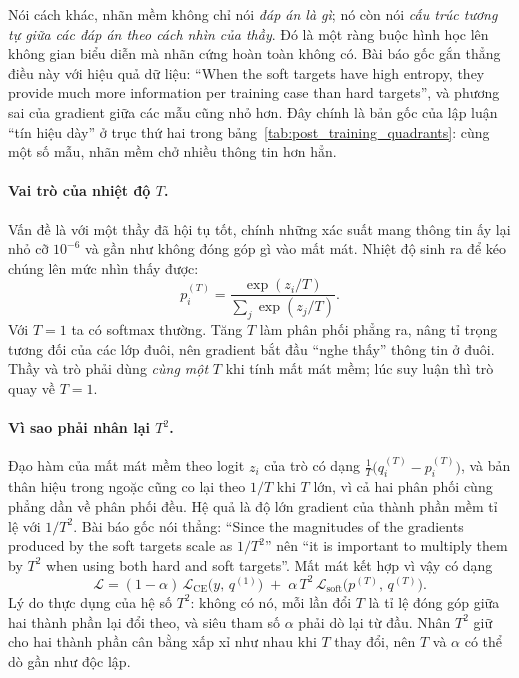 Nói cách khác, nhãn mềm không chỉ nói \emph{đáp án là gì}; nó còn nói \emph{cấu trúc tương tự giữa các đáp án theo cách nhìn của thầy}. Đó là một ràng buộc hình học lên không gian biểu diễn mà nhãn cứng hoàn toàn không có. Bài báo gốc gắn thẳng điều này với hiệu quả dữ liệu: ``When the soft targets have high entropy, they provide much more information per training case than hard targets'', và phương sai của gradient giữa các mẫu cũng nhỏ hơn. Đây chính là bản gốc của lập luận ``tín hiệu dày'' ở trục thứ hai trong bảng~\ref{tab:post_training_quadrants}: cùng một số mẫu, nhãn mềm chở nhiều thông tin hơn hẳn.

\paragraph{Vai trò của nhiệt độ $T$.} Vấn đề là với một thầy đã hội tụ tốt, chính những xác suất mang thông tin ấy lại nhỏ cỡ $10^{-6}$ và gần như không đóng góp gì vào mất mát. Nhiệt độ sinh ra để kéo chúng lên mức nhìn thấy được:
\[
p^{(T)}_i = \frac{\exp(z_i/T)}{\sum_j \exp(z_j/T)} .
\]
Với $T=1$ ta có softmax thường. Tăng $T$ làm phân phối phẳng ra, nâng tỉ trọng tương đối của các lớp đuôi, nên gradient bắt đầu ``nghe thấy'' thông tin ở đuôi. Thầy và trò phải dùng \emph{cùng một} $T$ khi tính mất mát mềm; lúc suy luận thì trò quay về $T=1$.

\paragraph{Vì sao phải nhân lại $T^2$.} Đạo hàm của mất mát mềm theo logit $z_i$ của trò có dạng $\tfrac{1}{T}\big(q^{(T)}_i - p^{(T)}_i\big)$, và bản thân hiệu trong ngoặc cũng co lại theo $1/T$ khi $T$ lớn, vì cả hai phân phối cùng phẳng dần về phân phối đều. Hệ quả là độ lớn gradient của thành phần mềm tỉ lệ với $1/T^2$. Bài báo gốc nói thẳng: ``Since the magnitudes of the gradients produced by the soft targets scale as $1/T^2$'' nên ``it is important to multiply them by $T^2$ when using both hard and soft targets''. Mất mát kết hợp vì vậy có dạng
\[
\mathcal{L} = (1-\alpha)\,\mathcal{L}_{\mathrm{CE}}\big(y,\, q^{(1)}\big)
 \;+\; \alpha\,T^2\,\mathcal{L}_{\mathrm{soft}}\big(p^{(T)},\, q^{(T)}\big).
\]
Lý do thực dụng của hệ số $T^2$: không có nó, mỗi lần đổi $T$ là tỉ lệ đóng góp giữa hai thành phần lại đổi theo, và siêu tham số $\alpha$ phải dò lại từ đầu. Nhân $T^2$ giữ cho hai thành phần cân bằng xấp xỉ như nhau khi $T$ thay đổi, nên $T$ và $\alpha$ có thể dò gần như độc lập.


